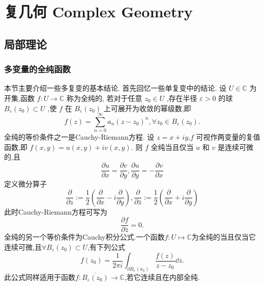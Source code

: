 \chapter{复几何 Complex Geometry}
\section{局部理论}
\subsection{多变量的全纯函数}
本节主要介绍一些多复变的基本结论.
首先回忆一些单复变中的结论. 设 $U \in \mathbb{C}$ 为开集,函数 $f: U \rightarrow \mathbb{C}$ 称为全纯的, 若对于任意 $z_{0} \in U$ ,存在半径 $\varepsilon>0$ 的球 $B_{\varepsilon}\left(z_{0}\right) \subset U$ ,使 $f$ 在 $B_{\varepsilon}\left(z_{0}\right)$ 上可展开为收敛的幂级数,即
\begin{equation}
  f(z)=\sum_{n=0}^{\infty} a_{n}\left(z-z_{0}\right)^{n}, \forall z_{0} \in B_{\varepsilon}\left(z_{0}\right) .
\end{equation}
全纯的等价条件之一是Cauchy-Riemann方程. 设 $z=x+i y $,$ f$ 可视作两变量的复值函数,即 $f(x, y)=u(x, y)+i v(x, y)$. 则 $f$ 全纯当且仅当 $u$ 和 $v$ 是连续可微的,且
\begin{equation}\label{C.-R. Equation}
  \frac{\partial u}{\partial x}=\frac{\partial v}{\partial y}, \frac{\partial u}{\partial y}=-\frac{\partial v}{\partial x}
\end{equation}
定义微分算子
\begin{equation}\label{eq:1.3}
  \frac{\partial}{\partial z}:=\frac{1}{2}\left(\frac{\partial}{\partial x}-i \frac{\partial}{\partial y}\right), \frac{\partial}{\partial \bar{z}}:=\frac{1}{2}\left(\frac{\partial}{\partial x}+i \frac{\partial}{\partial y}\right)
\end{equation}
此时Cauchy-Riemann方程可写为
\[
  \frac{\partial f}{\partial \overline{z}}=0.
\]
全纯的另一个等价条件为Cauchy积分公式.一个函数$f\colon U\mapsto \mathbb{C}$为全纯的当且仅当它连续可微,且$\forall B_\varepsilon (z_0)$\newline $\subset U$,有下列公式
\begin{equation}\label{}
  f(z_0)=\frac{1}{2\pi i}\int_{\partial B_\varepsilon(x_0)} \frac{f(z)}{z-z_0}\dd z.
\end{equation}
此公式同样适用于函数$f\colon \overline{B_\varepsilon (z_0)}\to \mathbb{C}$,若它连续且在内部全纯.


